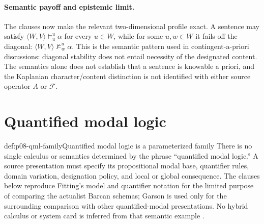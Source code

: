 \paragraph{Semantic payoff and epistemic limit.}
The clauses now make the relevant two-dimensional profile exact.  A sentence
may satisfy \(\langle W,V\rangle\models_u^u\alpha\) for every \(u\in W\),
while for some \(u,w\in W\) it fails off the diagonal:
\(\langle W,V\rangle\not\models_w^u\alpha\).  This is the
semantic pattern used in contingent-a-priori discussions: diagonal stability
does not entail necessity of the designated content.  The semantics alone does
not establish that a sentence is knowable a priori, and the Kaplanian
character/content distinction is not identified with either source operator
\(A\) or \(\mathcal F\).

\section{Quantified modal logic}

\begin{hbwarning}{def:p08-qml-family}{Quantified modal logic is a parameterized family}
There is no single calculus or semantics determined by the phrase
``quantified modal logic.''  A source presentation must specify its
propositional modal base, quantifier rules, domain variation, designation
policy, and local or global consequence.  The clauses below reproduce
Fitting's model and quantifier notation for the limited purpose of comparing
the actualist Barcan schemas; Garson is used only for the surrounding
comparison with other quantified-modal presentations.  No hybrid calculus or
system card is inferred from that semantic example
\cite{Fitting2002Alethic,FittingMendelsohn1998,Garson2001}.
\end{hbwarning}

